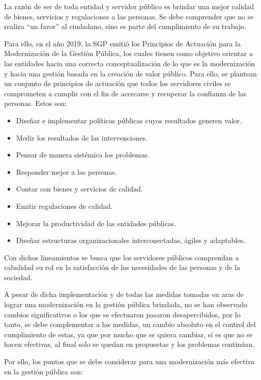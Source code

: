 \documentclass[
  jou,
  floatsintext,
  longtable,
  a4paper,
  nolmodern,
  notxfonts,
  notimes,
  12pt,
  colorlinks=true,linkcolor=blue,citecolor=blue,urlcolor=blue]{apa7}
\providecommand{\tightlist}{%
  \setlength{\itemsep}{0pt}\setlength{\parskip}{0pt}}
\begin{document}
La razón de ser de toda entidad y servidor público es brindar una mejor
calidad de bienes, servicios y regulaciones a las personas. Se debe
comprender que no se realiza ``un favor'' al ciudadano, sino es parte
del cumplimiento de su trabajo.

Para ello, en el año 2019, la SGP emitió los Principios de Actuación
para la Modernización de la Gestión Pública, los cuales tienen como
objetivo orientar a las entidades hacia una correcta conceptualización
de lo que es la modernización y hacia una gestión basada en la creación
de valor público. Para ello, se plantean un conjunto de principios de
actuación que todos los servidores civiles se comprometen a cumplir con
el fin de acercarse y recuperar la confianza de las personas. Estos son:

\begin{itemize}
\tightlist
\item
  Diseñar e implementar políticas públicas cuyos resultados generen
  valor.
\item
  Medir los resultados de las intervenciones.
\item
  Pensar de manera sistémica los problemas.
\item
  Responder mejor a las personas.
\item
  Contar con bienes y servicios de calidad.
\item
  Emitir regulaciones de calidad.
\item
  Mejorar la productividad de las entidades públicas.
\item
  Diseñar estructuras organizacionales interconectadas, ágiles y
  adaptables.
\end{itemize}

Con dichos lineamientos se busca que los servidores públicos comprendan
a cabalidad su rol en la satisfacción de las necesidades de las personas
y de la sociedad.

A pesar de dicha implementación y de todas las medidas tomadas en aras
de lograr una modernización en la gestión pública brindada, no se han
observado cambios significativos o los que se efectuaron pasaron
desapercibidos, por lo tanto, se debe complementar a las medidas, un
cambio absoluto en el control del cumplimiento de estas, ya que por
mucho que se quiera cambiar, si es que no se hacen efectivas, al final
solo se quedan en propuestas y los problemas continúan.

Por ello, los puntos que se debe considerar para una modernización más
efectiva en la gestión pública son:
\end{document}
